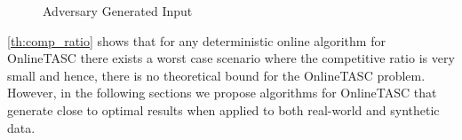 \begin{figure}[h]
    \centering
    \vspace{-0.15in}
    \caption{Adversary Generated Input}
    \label{fig:quality}
\end{figure}

\cref{th:comp_ratio} shows that for any deterministic online algorithm for OnlineTASC there exists a worst case scenario where the competitive ratio is very small and hence, there is no theoretical bound for the OnlineTASC problem. However, in the following sections we propose algorithms for OnlineTASC that generate close to optimal results when applied to both real-world and synthetic data.



